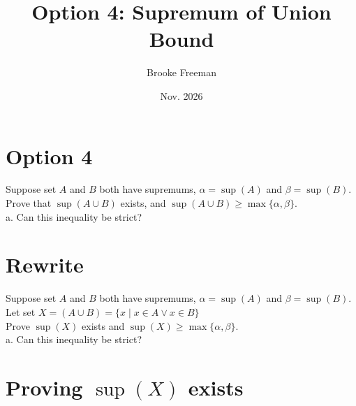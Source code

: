 \documentclass{article}
\title{Option 4: Supremum of Union Bound}
\author{Brooke Freeman}
\date{Nov. 2026}
\begin{document}
\maketitle

\section{Option 4}
Suppose set $A$ and $B$ both have supremums, $\alpha = \sup(A)$ and $\beta = \sup(B)$.\\
Prove that $\sup(A \cup B)$ exists, and $\sup(A \cup B) \geq \max\{\alpha,\beta\}$.\\
\indent a. Can this inequality be strict? 

\section{Rewrite}
Suppose set $A$ and $B$ both have supremums, $\alpha = \sup(A)$ and $\beta = \sup(B)$.\\
Let set $X = (A \cup B) = \{x \mid x \in A \lor x \in B\}$\\
Prove $\sup(X)$ exists and $\sup(X) \geq \max\{\alpha,\beta\}$.\\
\indent a. Can this inequality be strict?

\section{Proving $\sup(X)$ exists}
\end{document}
